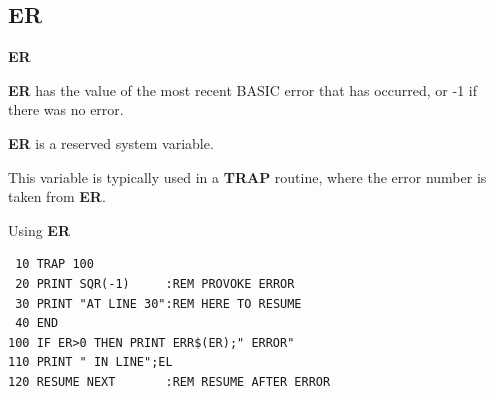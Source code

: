 \subsection{ER}
\begin{description}[leftmargin=2cm,style=nextline]
\item [Format:] {\bf ER}
\item [Usage:]  {\bf ER} has the value of the most recent BASIC error that has
               occurred, or -1 if there was no error.
\item [Remarks:] {\bf ER} is a reserved system variable.

This variable is typically used in a {\bf TRAP} routine,
where the error number is taken from {\bf ER}.

\item [Example:] Using {\bf ER}
\begin{tcolorbox}[colback=black,coltext=white]
\verbatimfont{\codefont}
\begin{verbatim}
 10 TRAP 100
 20 PRINT SQR(-1)     :REM PROVOKE ERROR
 30 PRINT "AT LINE 30":REM HERE TO RESUME
 40 END
100 IF ER>0 THEN PRINT ERR$(ER);" ERROR"
110 PRINT " IN LINE";EL
120 RESUME NEXT       :REM RESUME AFTER ERROR
\end{verbatim}
\end{tcolorbox}
\end{description}


\newpage
